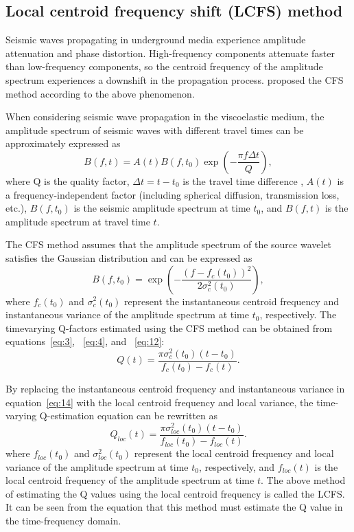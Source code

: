 \subsection{Local centroid frequency shift (LCFS) method}

Seismic waves propagating in underground media experience amplitude
attenuation and phase distortion. High-frequency components attenuate faster
than low-frequency components, so the centroid frequency of the amplitude
spectrum experiences a downshift in the propagation process. \cite{Quan97}
proposed the CFS method according to the above phenomenon.

When considering seismic wave propagation in the viscoelastic medium, the
amplitude spectrum of seismic waves with different travel times can be
approximately expressed as \cite[]{Zhang02}
\begin{equation}
  \label{eq:12}
  B(f,t)=A(t)B(f,t_0)\exp(-\frac{\pi f \Delta t}{Q}),
\end{equation}
where Q is the quality factor, $\Delta t=t-t_0$ is the travel time difference
, $A(t)$ is a frequency-independent factor (including spherical diffusion,
transmission loss, etc.), $B(f,t_0)$ is the seismic amplitude spectrum at
time $t_0$, and $B(f,t)$ is the amplitude spectrum at travel time $t$.

The CFS method assumes that the amplitude spectrum of the source wavelet
satisfies the Gaussian distribution and can be expressed as
\begin{equation}
  \label{eq:13}
  B(f,t_0)=\exp(-\frac{(f-f_c(t_0))^2}{2\sigma_c^2(t_0)}),
\end{equation}
where $f_c(t_0)$ and $\sigma_c^2(t_0)$ represent the instantaneous centroid
frequency and instantaneous variance of the amplitude spectrum at time $t_0$,
respectively. The timevarying Q-factors estimated using the CFS method can
be obtained from equations~\ref{eq:3}, ~\ref{eq:4}, and ~\ref{eq:12}:
\begin{equation}
  \label{eq:14}
  Q(t)=\frac{\pi\sigma_c^2(t_0)(t-t_0)}{f_c(t_0)-f_c(t)}.
\end{equation}

By replacing the instantaneous centroid frequency and instantaneous variance
in equation~\ref{eq:14} with the local centroid frequency and local variance,
the time-varying Q-estimation equation can be rewritten as
\begin{equation}
  \label{eq:15}
  Q_{loc}(t)=\frac{\pi\sigma_{loc}^2(t_0)(t-t_0)}{f_{loc}(t_0)-f_{loc}(t)}.
\end{equation}
where $f_{loc}(t_0)$ and $\sigma_{loc}^2(t_0)$ represent the local centroid
frequency and local variance of the amplitude spectrum at time $t_0$,
respectively, and $f_{loc}(t)$ is the local centroid frequency of the
amplitude spectrum at time $t$. The above method of estimating the Q
values using the local centroid frequency is called the LCFS. It can be seen
from the equation that this method must estimate the Q value in the
time-frequency domain.

